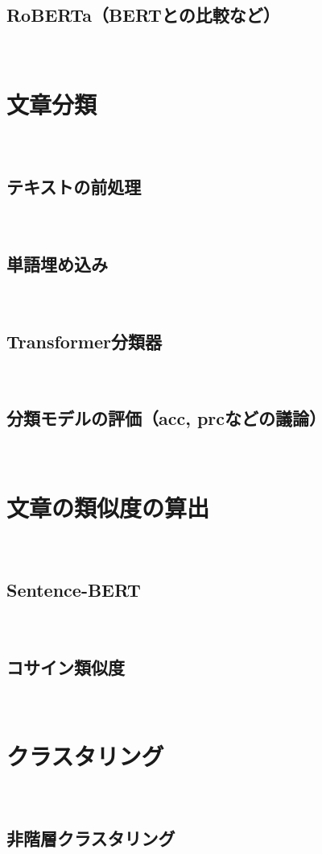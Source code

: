 \documentclass[12pt,a4j]{jreport}
\begin{document}
\subsection{RoBERTa（BERTとの比較など）}
~

\section{文章分類}
~

\subsection{テキストの前処理}
~

\subsection{単語埋め込み}
~

\subsection{Transformer分類器}
~

\subsection{分類モデルの評価（acc, prcなどの議論）}
~

\section{文章の類似度の算出}
~

\subsection{Sentence-BERT}
~

\subsection{コサイン類似度}
~

\section{クラスタリング}
~

\subsection{非階層クラスタリング}
~
\end{document}

